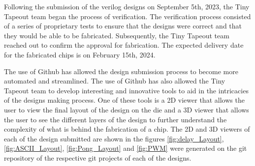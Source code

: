 Following the submission of the verilog designs on September 5th, 2023, the Tiny Tapeout team began the process of verification. 
The verification process consisted of a series of proprietary tests to ensure that the designs were correct and that they would be able to be fabricated.
Subsequently, the Tiny Tapeout team reached out to confirm the approval for fabrication. The expected delivery date for the fabricated chips is on February 15th, 2024.

The use of Github has allowed the design submission process to become more automated and streamlined. The use of Github has also allowed the Tiny Tapeout team to develop 
interesting and innovative tools to aid in the intricacies of the designs making process. One of these tools is a 2D viewer that allows the user to view the final 
layout of the design on the die and a 3D viewer that allows the user to see the different layers of the design to further understand the complexity of what is behind the 
fabrication of a chip. The 2D and 3D viewers of each of the design submitted are shown in the figures \ref*{fig:delay_Layout}, \ref*{fig:ASCII_Layout}, \ref*{fig:Pong_Layout} and \ref*{fig:PWM} 
were generated on the git repository of the respective git projects of each of the designs.

